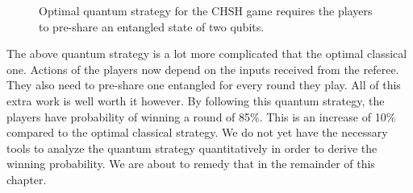 \begin{figure}[t]
    \centering
    
    \caption[Optimal quantum CHSH game strategy.]{Optimal quantum strategy for the CHSH game requires the players to pre-share an entangled state of two qubits.}
    \label{fig:chsh-game_entanglement}
\end{figure}

The above quantum strategy is a lot more complicated that the optimal classical one.
Actions of the players now depend on the inputs received from the referee.
They also need to pre-share one entangled for every round they play.
All of this extra work is well worth it however.
By following this quantum strategy, the players have probability of winning a round of 85\%.
This is an increase of 10\% compared to the optimal classical strategy.
We do not yet have the necessary tools to analyze the quantum strategy quantitatively in order to derive the winning probability.
We are about to remedy that in the remainder of this chapter.



